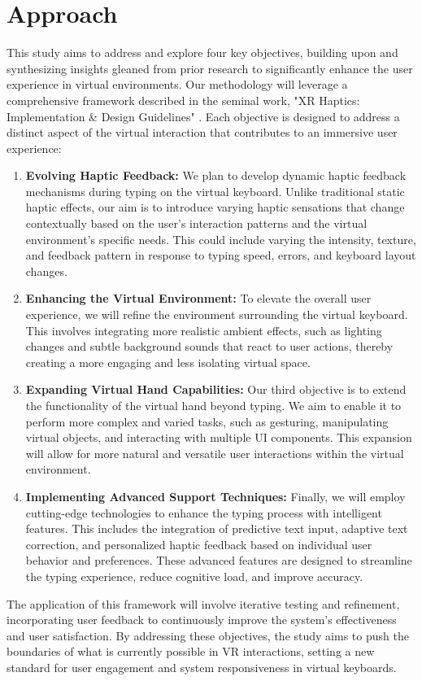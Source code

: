 \chapter{Approach}
\label{sec:Approach}

This study aims to address and explore four key objectives, building upon and synthesizing insights gleaned from prior research to significantly enhance the user experience in virtual environments. Our methodology will leverage a comprehensive framework described in the seminal work, "XR Haptics: Implementation \& Design Guidelines" \cite{hayward2022xr}. Each objective is designed to address a distinct aspect of the virtual interaction that contributes to an immersive user experience:

\begin{enumerate}
    \item \textbf{Evolving Haptic Feedback:} We plan to develop dynamic haptic feedback mechanisms during typing on the virtual keyboard. Unlike traditional static haptic effects, our aim is to introduce varying haptic sensations that change contextually based on the user’s interaction patterns and the virtual environment's specific needs. This could include varying the intensity, texture, and feedback pattern in response to typing speed, errors, and keyboard layout changes.
    
    \item \textbf{Enhancing the Virtual Environment:} To elevate the overall user experience, we will refine the environment surrounding the virtual keyboard. This involves integrating more realistic ambient effects, such as lighting changes and subtle background sounds that react to user actions, thereby creating a more engaging and less isolating virtual space.
    
    \item \textbf{Expanding Virtual Hand Capabilities:} Our third objective is to extend the functionality of the virtual hand beyond typing. We aim to enable it to perform more complex and varied tasks, such as gesturing, manipulating virtual objects, and interacting with multiple UI components. This expansion will allow for more natural and versatile user interactions within the virtual environment.
    
    \item \textbf{Implementing Advanced Support Techniques:} Finally, we will employ cutting-edge technologies to enhance the typing process with intelligent features. This includes the integration of predictive text input, adaptive text correction, and personalized haptic feedback based on individual user behavior and preferences. These advanced features are designed to streamline the typing experience, reduce cognitive load, and improve accuracy.
\end{enumerate}
The application of this framework will involve iterative testing and refinement, incorporating user feedback to continuously improve the system's effectiveness and user satisfaction. By addressing these objectives, the study aims to push the boundaries of what is currently possible in VR interactions, setting a new standard for user engagement and system responsiveness in virtual keyboards.

